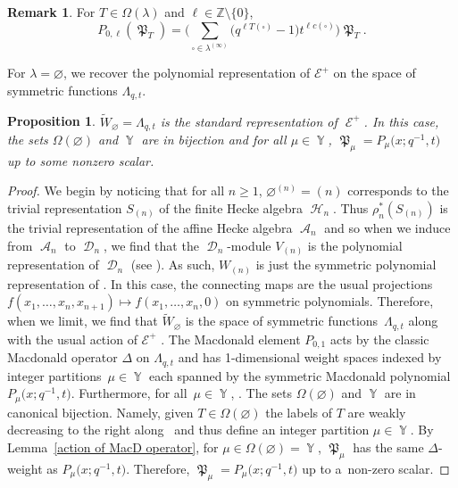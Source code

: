 \documentclass[pdftex]{sigma}
\numberwithin{equation}{section}
\newtheorem{Proposition}[Theorem]{Proposition}
\theoremstyle{definition}
\newtheorem{Remark}[Theorem]{Remark}
\DeclareMathOperator{\Par}{\mathbb{Y}}
\DeclareMathOperator{\sH}{\mathscr{H}}
\DeclareMathOperator{\sA}{\mathscr{A}}
\DeclareMathOperator{\sD}{\mathscr{D}}
\DeclareMathOperator{\MacD}{\mathfrak{P}}
\DeclareMathOperator{\sE}{\mathcal{E}}
\begin{document}
\begin{Remark}
 For $T \in \Omega(\lambda)$ and $\ell \in \mathbb{Z} \setminus \{0\}$,
 \[
 P_{0,\ell}(\MacD_T) = \biggl( \sum_{\square \in \lambda^{(\infty)}} \bigl(q^{\ell T(\square)}-1 \bigr) t^{\ell c(\square)} \biggr) \MacD_T.
 \]

\end{Remark}

For $\lambda = \varnothing$, we recover the polynomial representation of $\mathcal{E}^{+}$ on the space of symmetric functions $\Lambda_{q,t}$.

\begin{Proposition}\label{Proposition recover usual Macd}
 $\widetilde{W}_{\varnothing} = \Lambda_{q,t}$ is the standard representation of $\sE^{+}$. In this case, the sets $\Omega(\varnothing)$ and $\Par$ are in bijection and for all $\mu \in \Par$, $\MacD_{\mu} = P_{\mu}\bigl(x;q^{-1},t\bigr)$ up to some nonzero scalar.
\end{Proposition}
\begin{proof}
 We begin by noticing that for all $n\geq 1$, $\varnothing^{(n)} = (n)$ corresponds to the trivial representation $S_{(n)}$ of the finite Hecke algebra $\sH_n$. Thus $\rho_n^{*}(S_{(n)})$ is the trivial representation of the affine Hecke algebra $\sA_n$ and so when we induce from $\sA_n$ to $\sD_n$, we find that the $\sD_n$-module $V_{(n)}$ is the polynomial representation of $\sD_n$ (see \cite[Theorem 3.2.1]{CherednikBook}). As such, $W_{(n)}$ is just the symmetric polynomial representation of \smash{$\sD_n^{\mathrm{sph}}$}. In this case, the connecting maps  are the usual projections $f(x_1,\dots,x_n,x_{n+1}) \mapsto f(x_1,\dots,x_n,0)$ on symmetric polynomials.
 Therefore, when we limit, we find that $\widetilde{W}_{\varnothing}$ is the space of symmetric functions~$\Lambda_{q,t}$ along with the usual action of $\mathcal{E}^{+}$ \cite[Corollary 1.5]{SV}. The Macdonald element $P_{0,1}$ acts by the classic Macdonald operator $\Delta$ on $\Lambda_{q,t}$ and has 1-dimensional weight spaces indexed by integer partitions~${\mu \in \Par}$ each spanned by the symmetric Macdonald polynomial $P_{\mu}\bigl(x;q^{-1},t\bigr)$. Furthermore, for all~${\mu \in \Par}$,
 . The sets $\Omega(\varnothing)$ and $\Par$ are in canonical bijection. Namely, given $T \in \Omega(\varnothing)$ the labels of $T$ are weakly decreasing to the right along~\smash{$\varnothing^{(\infty)}$} and thus define an integer partition $\mu \in \Par$. By Lemma~\ref{action of MacD operator}, for $\mu \in \Omega(\varnothing)= \Par$, $\MacD_{\mu}$ has the same $\Delta$-weight as $P_{\mu}\bigl(x;q^{-1},t\bigr)$. Therefore, $\MacD_{\mu} = P_{\mu}\bigl(x;q^{-1},t\bigr)$ up to a~non-zero scalar.
\end{proof}
\end{document}
